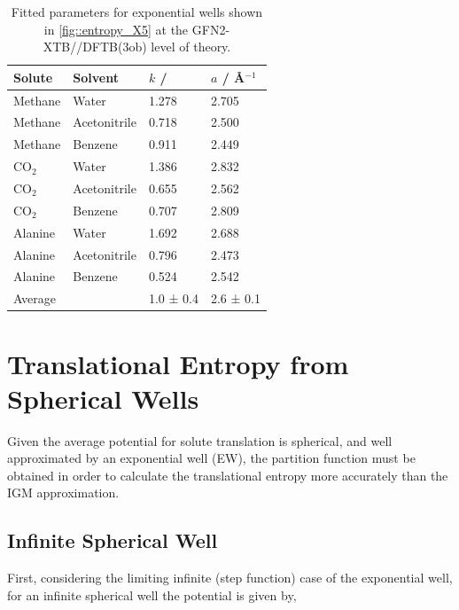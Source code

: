 \documentclass[../main.tex]{subfiles}
\begin{document}
\begin{table}[h!]
	\renewcommand{\arraystretch}{1.5}
	\begin{center}
		\small
		\begin{tabularx}{\textwidth}{YYYY} 
			\toprule
			Solute & Solvent& $k$ / \kcal & $a$ / \AA$^{-1}$ \\
			\hline
			Methane  & Water &   1.278    &   2.705     \\
			Methane  & Acetonitrile &   0.718    &   2.500    \\
			Methane  & Benzene &   0.911    &    2.449    \\
			CO$_2$  & Water&   1.386    &    2.832     \\
			CO$_2$  & Acetonitrile&   0.655    &    2.562   \\
			CO$_2$  & Benzene &    0.707   &    2.809   \\
			Alanine   &Water &     1.692  &    2.688     \\
			Alanine   & Acetonitrile&   0.796    &    2.473   \\
			Alanine   & Benzene &   0.524   &   2.542    \\
			\hline
			Average && 1.0 ± 0.4 & 2.6 ± 0.1 \\
			\bottomrule
		\end{tabularx}
	\end{center}
	\caption{Fitted parameters for exponential wells shown in \figurename{ \ref{fig::entropy_X5}} at the GFN2-XTB//DFTB(3ob) level of theory.} 
	\label{table::figX5_params}
\end{table}

\newpage
\section{Translational Entropy from Spherical Wells}
Given the average potential for solute translation is spherical, and well approximated by an exponential well (EW), the partition function must be obtained in order to calculate the translational entropy more accurately than the IGM approximation. 

\subsection{Infinite Spherical Well}

First, considering the limiting infinite (step function) case of the exponential well, for an infinite spherical well the potential is given by,
\end{document}
